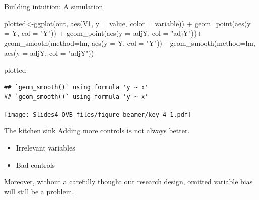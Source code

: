 \documentclass[
  ignorenonframetext,
]{beamer}
\newenvironment{Shaded}{\begin{snugshade}}{\end{snugshade}}
\newcommand{\AttributeTok}[1]{\textcolor[rgb]{0.77,0.63,0.00}{#1}}
\newcommand{\FunctionTok}[1]{\textcolor[rgb]{0.00,0.00,0.00}{#1}}
\newcommand{\NormalTok}[1]{#1}
\newcommand{\OtherTok}[1]{\textcolor[rgb]{0.56,0.35,0.01}{#1}}
\newcommand{\SpecialCharTok}[1]{\textcolor[rgb]{0.00,0.00,0.00}{#1}}
\newcommand{\StringTok}[1]{\textcolor[rgb]{0.31,0.60,0.02}{#1}}
\begin{document}
\begin{frame}[fragile]{Building intuition: A simulation}
\protect\hypertarget{building-intuition-a-simulation-6}{}
\tiny

\begin{Shaded}
\begin{Highlighting}[]
\NormalTok{plotted}\OtherTok{\textless{}{-}}\FunctionTok{ggplot}\NormalTok{(out, }\FunctionTok{aes}\NormalTok{(V1, }\AttributeTok{y =}\NormalTok{ value, }\AttributeTok{color =}\NormalTok{ variable)) }\SpecialCharTok{+} 
    \FunctionTok{geom\_point}\NormalTok{(}\FunctionTok{aes}\NormalTok{(}\AttributeTok{y =}\NormalTok{ Y, }\AttributeTok{col =} \StringTok{"Y"}\NormalTok{)) }\SpecialCharTok{+} 
    \FunctionTok{geom\_point}\NormalTok{(}\FunctionTok{aes}\NormalTok{(}\AttributeTok{y =}\NormalTok{ adjY, }\AttributeTok{col =} \StringTok{"adjY"}\NormalTok{))}\SpecialCharTok{+}
    \FunctionTok{geom\_smooth}\NormalTok{(}\AttributeTok{method=}\StringTok{\textquotesingle{}lm\textquotesingle{}}\NormalTok{, }\FunctionTok{aes}\NormalTok{(}\AttributeTok{y =}\NormalTok{ Y, }\AttributeTok{col =} \StringTok{"Y"}\NormalTok{))}\SpecialCharTok{+}
    \FunctionTok{geom\_smooth}\NormalTok{(}\AttributeTok{method=}\StringTok{\textquotesingle{}lm\textquotesingle{}}\NormalTok{, }\FunctionTok{aes}\NormalTok{(}\AttributeTok{y =}\NormalTok{ adjY, }\AttributeTok{col =} \StringTok{"adjY"}\NormalTok{))}

\NormalTok{plotted}
\end{Highlighting}
\end{Shaded}

\begin{verbatim}
## `geom_smooth()` using formula 'y ~ x'
## `geom_smooth()` using formula 'y ~ x'
\end{verbatim}

\texttt{[image: Slides4\_OVB\_files/figure-beamer/key 4-1.pdf]}

\normalsize
\end{frame}

\begin{frame}{The kitchen sink}
\protect\hypertarget{the-kitchen-sink}{}
Adding more controls is not always better.

\begin{itemize}
\item
  Irrelevant variables
\item
  Bad controls
\end{itemize}

Moreover, without a carefully thought out research design, omitted
variable bias will still be a problem.
\end{frame}
\end{document}
